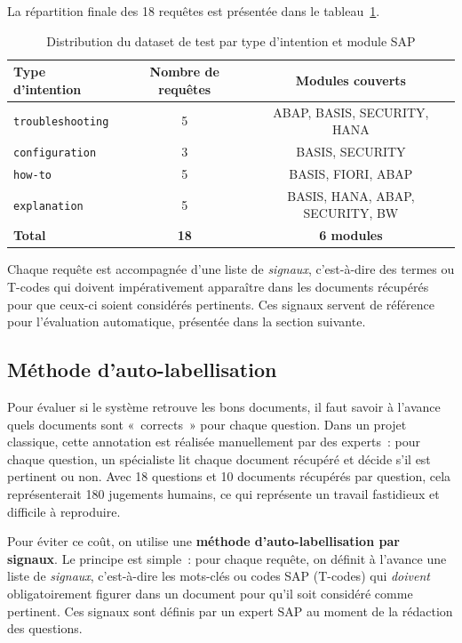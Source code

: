 La répartition finale des 18 requêtes est présentée dans le tableau~\ref{tab:dataset-distribution}.

\begin{table}[H]
\centering
\caption{Distribution du dataset de test par type d'intention et module SAP}
\label{tab:dataset-distribution}
\begin{tabular}{|l|c|c|}
\hline
\textbf{Type d'intention} & \textbf{Nombre de requêtes} & \textbf{Modules couverts} \\
\hline
\texttt{troubleshooting} & 5  & ABAP, BASIS, SECURITY, HANA \\
\hline
\texttt{configuration}   & 3  & BASIS, SECURITY \\
\hline
\texttt{how-to}          & 5  & BASIS, FIORI, ABAP \\
\hline
\texttt{explanation}     & 5  & BASIS, HANA, ABAP, SECURITY, BW \\
\hline
\textbf{Total}           & \textbf{18} & \textbf{6 modules} \\
\hline
\end{tabular}
\end{table}

Chaque requête est accompagnée d'une liste de \textit{signaux}, c'est-à-dire des termes ou T-codes qui doivent impérativement apparaître dans les documents récupérés pour que ceux-ci soient considérés pertinents. Ces signaux servent de référence pour l'évaluation automatique, présentée dans la section suivante.

\subsection{Méthode d'auto-labellisation}

Pour évaluer si le système retrouve les bons documents, il faut savoir à l'avance quels documents sont «~corrects~» pour chaque question. Dans un projet classique, cette annotation est réalisée manuellement par des experts~: pour chaque question, un spécialiste lit chaque document récupéré et décide s'il est pertinent ou non. Avec 18 questions et 10 documents récupérés par question, cela représenterait 180 jugements humains, ce qui représente un travail fastidieux et difficile à reproduire.

Pour éviter ce coût, on utilise une \textbf{méthode d'auto-labellisation par signaux}. Le principe est simple~: pour chaque requête, on définit à l'avance une liste de \textit{signaux}, c'est-à-dire les mots-clés ou codes SAP (T-codes) qui \emph{doivent} obligatoirement figurer dans un document pour qu'il soit considéré comme pertinent. Ces signaux sont définis par un expert SAP au moment de la rédaction des questions.

